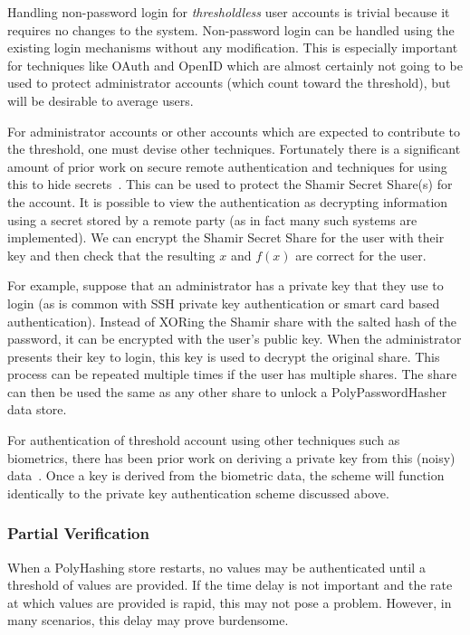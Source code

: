 Handling non-password login for \emph{thresholdless} user accounts is trivial 
because
it requires no changes to the system.   Non-password login can be handled 
using the existing login mechanisms without any modification.
This is especially important for techniques like OAuth and OpenID which 
are almost certainly not going to be used to protect administrator accounts
(which count toward the threshold), but will be desirable to average users.

For administrator accounts or other accounts which are expected to contribute
to the threshold, one must devise other techniques.   Fortunately there is
a significant amount of prior work on secure remote authentication and
techniques for using this to hide 
secrets~\cite{deo1998authentication, yang1999password}.   This can be used to 
protect the Shamir Secret Share(s) for the account.
It is possible to view the authentication as decrypting information using a 
secret stored by a remote party (as in fact many such systems are implemented).
We can encrypt the Shamir Secret Share for the user with their key and then
check that the resulting $x$ and $f(x)$ are correct for the user.   

For example, suppose that an administrator has a private key that they use
to login (as is common with SSH private key authentication or smart card
based authentication).   Instead of
XORing the Shamir share with the salted hash of the password, it can
be encrypted with the user's public key.   When the administrator presents
their key to login, this key is used to decrypt the original share.   This
process can be repeated multiple times if the user has multiple shares.
 The share can then be used the same as any other share to 
unlock a PolyPasswordHasher data store.


For authentication of threshold account using other techniques such as 
biometrics, there has been prior work on deriving a private key from this 
(noisy) data~\cite{juels2006fuzzy}.   Once a key is derived from the biometric 
data, the scheme will function identically to the private key authentication 
scheme discussed above.




\subsubsection{Partial Verification}
\label{sec-partial}

When a PolyHashing store restarts, no values may be authenticated until a
threshold of values are provided.   If the time delay is not important and the 
rate at which values are provided is rapid, this may not pose a problem.   
However, in many scenarios, this delay may prove burdensome.

